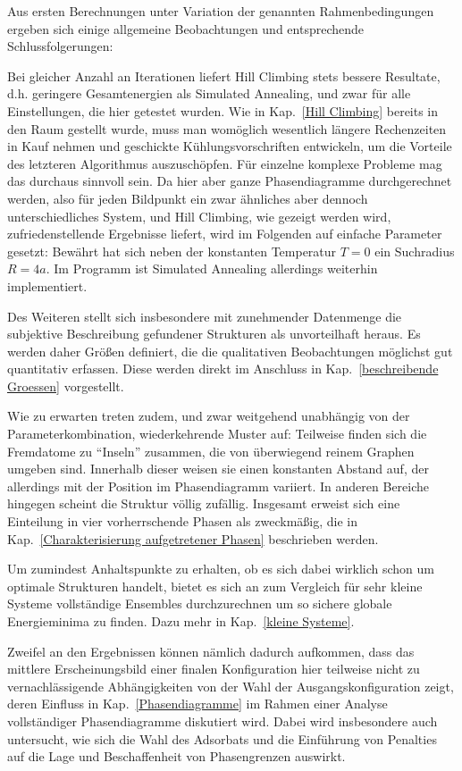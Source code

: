 \documentclass[a4paper, 10pt, twoside, openany]{book} %
\begin{document}
	Aus ersten Berechnungen unter Variation der genannten Rahmenbedingungen ergeben sich einige allgemeine Beobachtungen und entsprechende Schlussfolgerungen:
	
	Bei gleicher Anzahl an Iterationen liefert Hill Climbing stets bessere Resultate, d.h. geringere Gesamtenergien als Simulated Annealing, und zwar für alle Einstellungen, die hier getestet wurden. Wie in Kap.~\ref{Hill Climbing} bereits in den Raum gestellt wurde, muss man womöglich wesentlich längere Rechenzeiten in Kauf nehmen und geschickte Kühlungsvorschriften entwickeln, um die Vorteile des letzteren Algorithmus auszuschöpfen. Für einzelne komplexe Probleme mag das durchaus sinnvoll sein. Da hier aber ganze Phasendiagramme durchgerechnet werden, also für jeden Bildpunkt ein zwar ähnliches aber dennoch unterschiedliches System, und Hill Climbing, wie gezeigt werden wird, zufriedenstellende Ergebnisse liefert, wird im Folgenden auf einfache Parameter gesetzt: Bewährt hat sich neben der konstanten Temperatur $T = 0$ ein Suchradius $R = 4 a$. Im Programm ist Simulated Annealing allerdings weiterhin implementiert.
	
	Des Weiteren stellt sich insbesondere mit zunehmender Datenmenge die subjektive Beschreibung gefundener Strukturen als unvorteilhaft heraus. Es werden daher Größen definiert, die die qualitativen Beobachtungen möglichst gut quantitativ erfassen. Diese werden direkt im Anschluss in Kap.~\ref{beschreibende Groessen} vorgestellt.
	
	Wie zu erwarten treten zudem, und zwar weitgehend unabhängig von der Parameterkombination, wiederkehrende Muster auf: Teilweise finden sich die Fremdatome zu "`Inseln"' zusammen, die von überwiegend reinem Graphen umgeben sind. Innerhalb dieser weisen sie einen konstanten Abstand auf, der allerdings mit der Position im Phasendiagramm variiert. In anderen Bereiche hingegen scheint die Struktur völlig zufällig. Insgesamt erweist sich eine Einteilung in vier vorherrschende Phasen als zweckmäßig, die in Kap.~\ref{Charakterisierung aufgetretener Phasen} beschrieben werden.
	
	Um zumindest Anhaltspunkte zu erhalten, ob es sich dabei wirklich schon um optimale Strukturen handelt, bietet es sich an zum Vergleich für sehr kleine Systeme vollständige Ensembles durchzurechnen um so sichere globale Energieminima zu finden. Dazu mehr in Kap.~\ref{kleine Systeme}.
	
	Zweifel an den Ergebnissen können nämlich dadurch aufkommen, dass das mittlere Erscheinungsbild einer finalen Konfiguration hier teilweise nicht zu vernachlässigende Abhängigkeiten von der Wahl der Ausgangskonfiguration zeigt, deren Einfluss in Kap.~\ref{Phasendiagramme} im Rahmen einer Analyse vollständiger Phasendiagramme diskutiert wird. Dabei wird insbesondere auch untersucht, wie sich die Wahl des Adsorbats und die Einführung von Penalties auf die Lage und Beschaffenheit von Phasengrenzen auswirkt.
	
\end{document}
